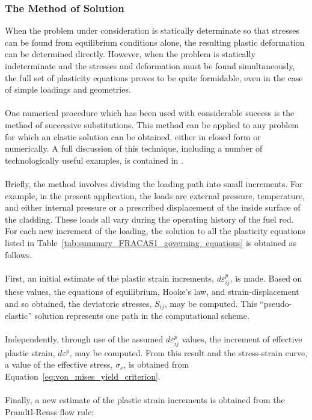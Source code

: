 \subsubsection{The Method of Solution} \label{section:method_of_solution}

When the problem under consideration is statically determinate so that stresses can be found from
equilibrium conditions alone, the resulting plastic deformation can be determined directly. However,
when the problem is statically indeterminate and the stresses and deformation must be found
simultaneously, the full set of plasticity equations proves to be quite formidable, even in the case
of simple loadings and geometries.
\\
\\
One numerical procedure which has been used with considerable success is the method of successive
substitutions. This method can be applied to any problem for which an elastic solution can be
obtained, either in closed form or numerically. A full discussion of this technique, including a
number of technologically useful examples, is contained in \cite{ref:Knuutila2006a}.
\\
\\
Briefly, the method involves dividing the loading path into small increments. For example, in the
present application, the loads are external pressure, temperature, and either internal pressure or a
prescribed displacement of the inside surface of the cladding. These loads all vary during the
operating history of the fuel rod. For each new increment of the loading, the solution to all the
plasticity equations listed in Table~\ref{tab:summary_FRACAS1_governing_equations} is obtained as
follows.
\\
\\
First, an initial estimate of the plastic strain increments, \(d\varepsilon_{ij}^{p}\), is made.
Based on these values, the equations of equilibrium, Hooke's law, and strain-displacement and so
obtained, the deviatoric stresses, \(S_{ij}\), may be computed. This ``pseudo-elastic'' solution
represents one path in the computational scheme.
\\
\\
Independently, through use of the assumed \(d\varepsilon_{ij}^{p}\) values, the increment of
effective plastic strain, \(d\varepsilon^{p}\), may be computed. From this result and the
stress-strain curve, a value of the effective stress, \(\sigma_{e}\), is obtained from
Equation~\ref{eq:von_mises_yield_criterion}.
\\
\\
Finally, a new estimate of the plastic strain increments is obtained from the Prandtl-Reuss flow
rule:

